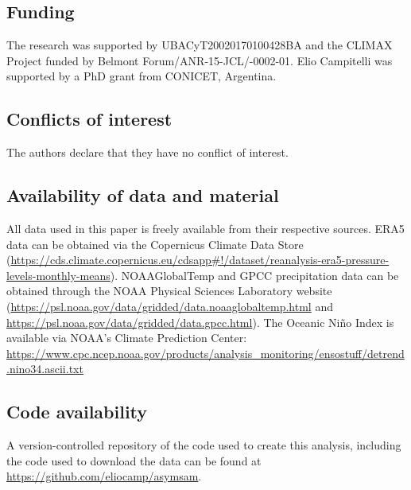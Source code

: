 \documentclass[smallextended]{svjour3}       %
\begin{document}
\hypertarget{funding}{%
\subsection*{Funding}\label{funding}}

The research was supported by UBACyT20020170100428BA and the CLIMAX Project funded by Belmont Forum/ANR-15-JCL/-0002-01. Elio Campitelli was supported by a PhD grant from CONICET, Argentina.

\hypertarget{conflicts-of-interest}{%
\subsection*{Conflicts of interest}\label{conflicts-of-interest}}

The authors declare that they have no conflict of interest.

\hypertarget{availability-of-data-and-material}{%
\subsection*{Availability of data and material}\label{availability-of-data-and-material}}

All data used in this paper is freely available from their respective sources. ERA5 data can be obtained via the Copernicus Climate Data Store (\url{https://cds.climate.copernicus.eu/cdsapp\#!/dataset/reanalysis-era5-pressure-levels-monthly-means}). NOAAGlobalTemp and GPCC precipitation data can be obtained through the NOAA Physical Sciences Laboratory website (\url{https://psl.noaa.gov/data/gridded/data.noaaglobaltemp.html} and \url{https://psl.noaa.gov/data/gridded/data.gpcc.html}). The Oceanic Niño Index is available via NOAA's Climate Prediction Center: \url{https://www.cpc.ncep.noaa.gov/products/analysis_monitoring/ensostuff/detrend.nino34.ascii.txt}

\hypertarget{code-availability}{%
\subsection*{Code availability}\label{code-availability}}

A version-controlled repository of the code used to create this analysis, including the code used to download the data can be found at \url{https://github.com/eliocamp/asymsam}.
\end{document}
